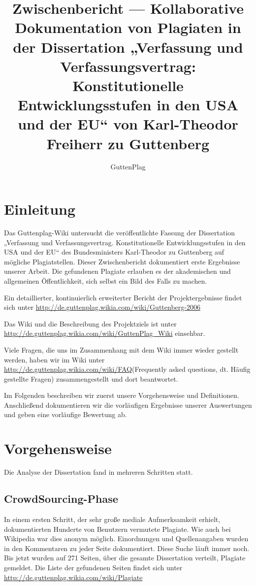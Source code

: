 \documentclass[ngerman,final,fontsize=12pt,paper=a4,twoside,BCOR=8mm,draft=false]{scrartcl}
\author{GuttenPlag}
\title{Zwischenbericht --- Kollaborative
  Dokumentation von Plagiaten in der Dissertation „Verfassung und
  Verfassungsvertrag: Konstitutionelle Entwicklungsstufen in den USA
  und der EU“ von Karl-Theodor Freiherr zu Guttenberg}
\begin{document}

\maketitle
\tableofcontents

\section{Einleitung}
Das Guttenplag-Wiki untersucht die veröffentlichte Fassung der Dissertation „Verfassung und Verfassungsvertrag. Konstitutionelle Entwicklungsstufen in den USA und der EU“ des Bundesministers Karl-Theodor zu Guttenberg auf mögliche Plagiatstellen.
Dieser Zwischenbericht dokumentiert erste Ergebnisse unserer Arbeit. Die gefundenen Plagiate erlauben es der akademischen und allgemeinen Öffentlichkeit, sich selbst ein Bild des Falls zu machen.

Ein detaillierter, kontinuierlich erweiterter Bericht der
Projektergebnisse findet sich unter
\url{http://de.guttenplag.wikia.com/wiki/Guttenberg-2006}

Das Wiki und die Beschreibung des Projektziels ist unter
\url{http://de.guttenplag.wikia.com/wiki/GuttenPlag\_Wiki} einsehbar.

Viele Fragen, die uns im Zusammenhang mit dem Wiki immer wieder
gestellt werden, haben wir im Wiki unter
\url{http://de.guttenplag.wikia.com/wiki/FAQ}(Frequently asked
questions, dt. Häufig gestellte Fragen) zusammengestellt und dort
beantwortet.

Im Folgenden beschreiben wir zuerst unsere Vorgehensweise und Definitionen. Anschließend dokumentieren wir die vorläufigen Ergebnisse unserer Auswertungen und geben eine vorläufige Bewertung ab.

\section{Vorgehensweise}
Die Analyse der Dissertation fand in mehreren Schritten statt.
\subsection{CrowdSourcing-Phase}
In einem ersten Schritt, der sehr große mediale Aufmerksamkeit erhielt, dokumentierten Hunderte von Benutzern vermutete Plagiate. Wie auch bei Wikipedia war dies anonym möglich. Einordnungen und Quellenangaben wurden in den Kommentaren zu jeder Seite dokumentiert. Diese Suche läuft immer noch. Bis jetzt wurden auf 271 Seiten, über die gesamte Dissertation verteilt, Plagiate gemeldet. Die Liste der gefundenen Seiten findet sich unter \url{http://de.guttenplag.wikia.com/wiki/Plagiate}
\end{document}
